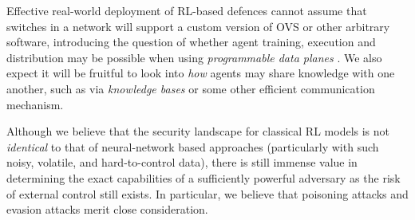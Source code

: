 \documentclass[conference, a4paper, 10pt, times]{IEEEtran}
\begin{document}
Effective real-world deployment of RL-based defences cannot assume that switches in a network will support a custom version of OVS or other arbitrary software, introducing the question of whether agent training, execution and distribution may be possible when using \emph{programmable data planes} \cite{DBLP:conf/ancs/JouetP17}.
We also expect it will be fruitful to look into \emph{how} agents may share knowledge with one another, such as via \emph{knowledge bases} or some other efficient communication mechanism.

Although we believe that the security landscape for classical RL models is not \emph{identical} to that of neural-network based approaches (particularly with such noisy, volatile, and hard-to-control data), there is still immense value in determining the exact capabilities of a sufficiently powerful adversary as the risk of external control still exists.
In particular, we believe that poisoning attacks and evasion attacks merit close consideration.
\end{document}
